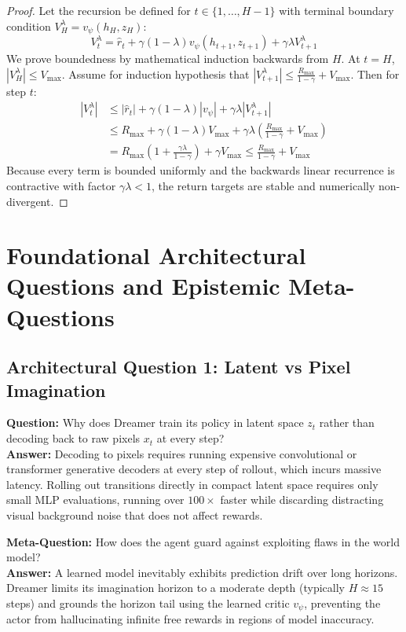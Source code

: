\documentclass[11pt,a4paper]{article}
\theoremstyle{definition}
\begin{document}
\begin{proof}
Let the recursion be defined for $t \in \{1, \dots, H-1\}$ with terminal boundary condition $V_H^\lambda = v_\psi(h_H, z_H)$:
{\boldmath
\begin{equation}
V_t^\lambda = \hat{r}_t + \gamma (1 - \lambda) v_\psi(h_{t+1}, z_{t+1}) + \gamma \lambda V_{t+1}^\lambda
\end{equation}
}
We prove boundedness by mathematical induction backwards from $H$.
At $t = H$, $|V_H^\lambda| \le V_{\max}$.
Assume for induction hypothesis that $|V_{t+1}^\lambda| \le \frac{R_{\max}}{1 - \gamma} + V_{\max}$.
Then for step $t$:
{\boldmath
\begin{align}
|V_t^\lambda| &\le |\hat{r}_t| + \gamma (1 - \lambda) |v_\psi| + \gamma \lambda |V_{t+1}^\lambda| \\
&\le R_{\max} + \gamma (1 - \lambda) V_{\max} + \gamma \lambda \left( \frac{R_{\max}}{1 - \gamma} + V_{\max} \right) \\
&= R_{\max}\left(1 + \frac{\gamma \lambda}{1 - \gamma}\right) + \gamma V_{\max} \le \frac{R_{\max}}{1 - \gamma} + V_{\max}
\end{align}
}
Because every term is bounded uniformly and the backwards linear recurrence is contractive with factor $\gamma \lambda < 1$, the return targets are stable and numerically non-divergent.
\end{proof}

\section{Foundational Architectural Questions and Epistemic Meta-Questions}

\subsection{Architectural Question 1: Latent vs Pixel Imagination}
\textbf{Question:} Why does Dreamer train its policy in latent space $z_t$ rather than decoding back to raw pixels $x_t$ at every step?\\
\textbf{Answer:} Decoding to pixels requires running expensive convolutional or transformer generative decoders at every step of rollout, which incurs massive latency. Rolling out transitions directly in compact latent space requires only small MLP evaluations, running over $100\times$ faster while discarding distracting visual background noise that does not affect rewards.

\textbf{Meta-Question:} How does the agent guard against exploiting flaws in the world model?\\
\textbf{Answer:} A learned model inevitably exhibits prediction drift over long horizons. Dreamer limits its imagination horizon to a moderate depth (typically $H \approx 15$ steps) and grounds the horizon tail using the learned critic $v_\psi$, preventing the actor from hallucinating infinite free rewards in regions of model inaccuracy.
\end{document}

